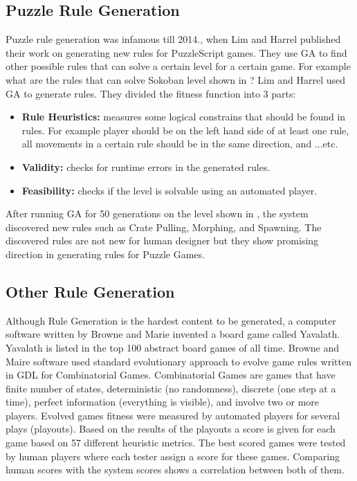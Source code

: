 \subsection{Puzzle Rule Generation}
Puzzle rule generation was infamous till 2014., when Lim and Harrel\cite{puzzleScriptGeneration} published their work on generating new rules for PuzzleScript games. They use GA to find other possible rules that can solve a certain level for a certain game. For example what are the rules that can solve Sokoban level shown in ? Lim and Harrel used GA to generate rules. They divided the fitness function into 3 parts:
\begin{itemize} \itemsep0pt \parskip0pt 
	\item \textbf{Rule Heuristics:} measures some logical constrains that should be found in rules. For example player should be on the left hand side of at least one rule, all movements in a certain rule should be in the same direction, and ...etc.
	\item \textbf{Validity:} checks for runtime errors in the generated rules.
	\item \textbf{Feasibility:} checks if the level is solvable using an automated player.
\end{itemize}
After running GA for 50 generations on the level shown in , the system discovered new rules such as Crate Pulling, Morphing, and Spawning. The discovered rules are not new for human designer but they show promising direction in generating rules for Puzzle Games.


\subsection{Other Rule Generation}
Although Rule Generation is the hardest content to be generated, a computer software written by Browne and Marie invented a board game called Yavalath. Yavalath is listed in the top 100 abstract board games of all time\cite{yavalath}. Browne and Maire software\cite{evolveBrowne} used standard evolutionary approach to evolve game rules written in GDL for Combinatorial Games. Combinatorial Games are games that have finite number of states, deterministic (no randomness), discrete (one step at a time), perfect information (everything is visible), and involve two or more players. Evolved games fitness were measured by automated players for several plays (playouts). Based on the results of the playouts a score is given for each game based on 57 different heuristic metrics. The best scored games were tested by human players where each tester assign a score for these games. Comparing human scores with the system scores shows a correlation between both of them.\\\par

